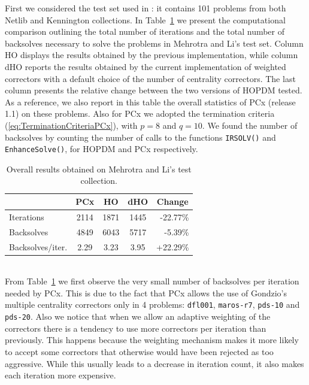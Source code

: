 First we considered the test set used in \cite{MehrotraLi}: 
it contains 101 problems from both Netlib and Kennington collections. 
%
In Table~\ref{MLtotals} we present the computational comparison 
outlining the total number of iterations and the total number 
of backsolves necessary to solve the problems in Mehrotra and Li's test set. 
Column HO displays the results obtained
by the previous implementation, while column dHO reports
the results obtained by the current implementation of weighted
correctors with a default choice of the number of centrality correctors. 
The last column presents the relative change between the two 
versions of HOPDM tested. 
As a reference, we also report in this table the overall
statistics of PCx (release 1.1) on these problems. Also for PCx we adopted
the termination criteria (\ref{eq:TerminationCriteriaPCx}),
with $p = 8$ and $q = 10$.
We found the number of backsolves by counting the number of calls 
to the functions {\tt IRSOLV()} and {\tt EnhanceSolve()}, for HOPDM and
PCx respectively.
%
\begin{table}[ht]
  \centering
  \begin{tabular}{|l|c||c|c|r|}\cline{2-5}
    \multicolumn{1}{c|}{}& PCx & HO & dHO &\multicolumn{1}{c|}{Change}\\ \hline
    Iterations       & 2114 & 1871  & 1445           &   -22.77\% \\ 
    Backsolves       & 4849 & 6043  & 5717           &   -5.39\%  \\
    Backsolves/iter. & 2.29 & 3.23  & 3.95           &   +22.29\% \\ \hline
  \end{tabular}
  \caption{Overall results obtained on Mehrotra and Li's test collection.}
  \label{MLtotals}
\end{table}
%
\\From Table~\ref{MLtotals} we first observe the very small number 
of backsolves per iteration needed by PCx. This is due to the fact 
that PCx allows the use of Gondzio's multiple centrality correctors 
only in 4 problems: {\tt dfl001}, {\tt maros-r7}, {\tt pds-10} and 
{\tt pds-20}.
%
Also we notice that when we allow an adaptive weighting 
of the correctors there is a tendency to use more correctors 
per iteration than previously. 
This happens because the weighting mechanism makes it more likely
to accept some correctors that otherwise would have been rejected
as too aggressive.
While this usually leads to a decrease 
in iteration count, it also makes each iteration more expensive.

